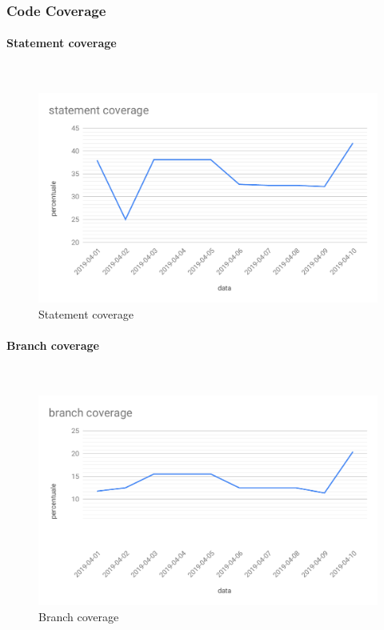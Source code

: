 \subsubsection{Code Coverage}
\paragraph{Statement coverage}\mbox{}\\
\begin{figure}[H]
	\centering
	\includegraphics[scale=0.6]{res/images/RQ/statement-coverage-RQ.pdf}
	\caption{Statement coverage}
\end{figure}	
\paragraph{Branch coverage}\mbox{}\\
\begin{figure}[H]
	\centering
	\includegraphics[scale=0.6]{res/images/RQ/branch-coverage-RQ.pdf}
	\caption{Branch coverage}
\end{figure}
